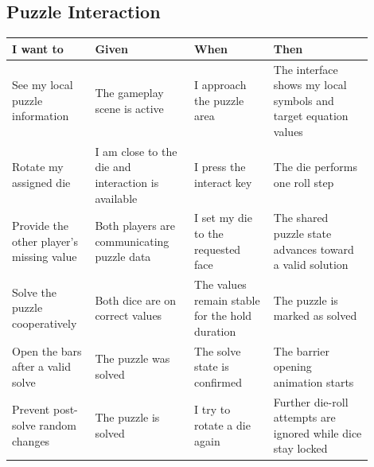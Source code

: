 \subsection*{Puzzle Interaction}
\begin{table}[H]
\centering
\caption{User Stories: Puzzle Interaction}
\label{tab:userstories-puzzle}
\begin{longtable}{|>{\centering\arraybackslash}m{0.20\linewidth}|>{\centering\arraybackslash}m{0.25\linewidth}|>{\centering\arraybackslash}m{0.20\linewidth}|>{\centering\arraybackslash}m{0.25\linewidth}|}
\hline
\hline
\textbf{I want to} & \textbf{Given} & \textbf{When} & \textbf{Then} \\
\hline
See my local puzzle information & The gameplay scene is active & I approach the puzzle area & The interface shows my local symbols and target equation values \\
\hline
Rotate my assigned die & I am close to the die and interaction is available & I press the interact key & The die performs one roll step \\
\hline
Provide the other player's missing value & Both players are communicating puzzle data & I set my die to the requested face & The shared puzzle state advances toward a valid solution \\
\hline
Solve the puzzle cooperatively & Both dice are on correct values & The values remain stable for the hold duration & The puzzle is marked as solved \\
\hline
Open the bars after a valid solve & The puzzle was solved & The solve state is confirmed & The barrier opening animation starts \\
\hline
Prevent post-solve random changes & The puzzle is solved & I try to rotate a die again & Further die-roll attempts are ignored while dice stay locked \\
\hline
\end{longtable}
\addtocounter{table}{-1}
\end{table}

